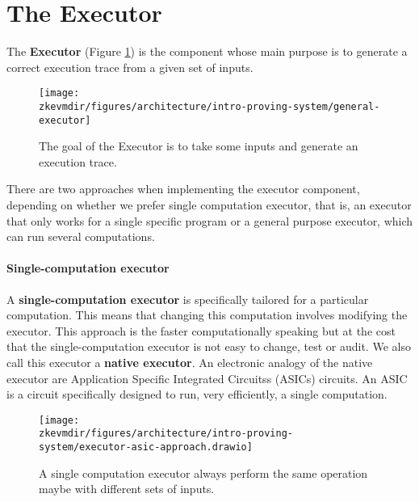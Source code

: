 




\section{The Executor}
The \textbf{Executor} (Figure \ref{fig:executor-goal}) is the component whose main purpose is to generate a correct execution trace from a given set of inputs.
\begin{figure}[H]
\centering
\texttt{[image: \\zkevmdir/figures/architecture/intro-proving-system/general-executor]}
\caption{The goal of the Executor is to take some inputs and generate an execution trace. }
\label{fig:executor-goal}
\end{figure}

There are two approaches when implementing the executor component, depending on whether we prefer single computation executor, that is, an executor that only works for a single specific program or a general purpose executor, which can run several computations.

\paragraph*{Single-computation executor}

A \textbf{single-computation executor} is specifically tailored for a particular computation. This means that changing this computation involves modifying the executor. This approach is the faster computationally speaking but at the cost that the single-computation executor is not easy to change, test or audit. We also call this executor a \textbf{native executor}. An electronic analogy of the native executor are Application Specific Integrated Circuitss (ASICs) circuits. An ASIC is a circuit specifically designed to run, very efficiently, a single computation.

\begin{figure}[H]
\centering
\texttt{[image: \\zkevmdir/figures/architecture/intro-proving-system/executor-asic-approach.drawio]}
\caption{A single computation executor always perform the same operation maybe with different sets of inputs.}
\label{fig:single-computation-executor}
\end{figure}


